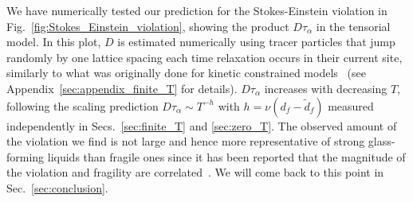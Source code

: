 \documentclass[pre,twocolumn,superscriptaddress,tightenlines,showpacs,longbibliography,floatfix,footinbib]{revtex4-1}
\begin{document}
We have numerically tested our prediction for the Stokes-Einstein violation in Fig.~\ref{fig:Stokes_Einstein_violation}, showing the product $D\tau_\alpha$ in the tensorial model. In this plot,  $D$ is estimated numerically using tracer particles that jump randomly by one lattice spacing each time relaxation occurs in their current site, similarly to what was originally done for kinetic constrained models~\cite{jung2004excitation,berthier2004length} (see Appendix~\ref{sec:appendix_finite_T} for details). 
$D\tau_\alpha$ increases with decreasing $T$, following the scaling prediction $D\tau_\alpha \sim T^{-h}$ with $h=\nu(d_f - \tilde d_f)$ measured independently in Secs.~\ref{sec:finite_T} and \ref{sec:zero_T}.
The observed amount of the violation we find is not large and hence more representative of strong glass-forming liquids than fragile ones since it has been reported that the magnitude of the violation and fragility are correlated~\cite{ediger2000spatially,ozawa2016tuning}. We will come back to this point in Sec.~\ref{sec:conclusion}. 


\end{document}
